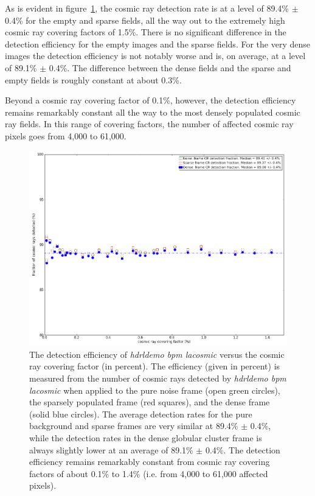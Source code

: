 As is evident in figure~\ref{fig:detect_efficiency}, the cosmic ray detection rate is at a level of 
89.4\% $\pm$ 0.4\% for the empty and sparse fields, all the way out to the extremely high cosmic ray covering factors of 1.5\%.   
There is no significant difference in the detection efficiency for the empty images and the sparse fields.
For the very dense images the detection efficiency is not notably worse and is, on average, at a level of 89.1\% $\pm$ 0.4\%.    
The difference between the dense fields and the sparse and empty fields is roughly constant at about 0.3\%.   	
 
Beyond a cosmic ray covering factor of 0.1\%, however, the detection efficiency remains remarkably constant all the way to the 
most densely populated cosmic ray fields.  In this range of covering factors, the number of affected cosmic ray pixels goes 
from 4,000 to 61,000.


\begin{figure}[t]
 \subfigure
\centering
\includegraphics[width=12cm]{figures/LACosmic_det_eff.png} 
\caption[]
	{\footnotesize  The detection efficiency of {\em hdrldemo bpm lacosmic} versus the cosmic ray covering factor (in percent).  The efficiency (given in percent) is measured
	from the number of cosmic rays detected by {\em hdrldemo bpm lacosmic} when applied to the pure noise frame (open green circles), the sparsely populated frame (red squares),
	and the dense frame (solid blue circles).  The average detection rates for the pure background and sparse frames are very similar at 89.4\% $\pm$ 0.4\%, while
	the detection rates in the dense globular cluster frame is always slightly lower at an average of 89.1\% $\pm$ 0.4\%.  The detection efficiency remains remarkably
	constant from cosmic ray covering factors of about 0.1\% to 1.4\% (i.e. from 4,000 to 61,000 affected pixels).
	}
	\label{fig:detect_efficiency}
\end{figure}



